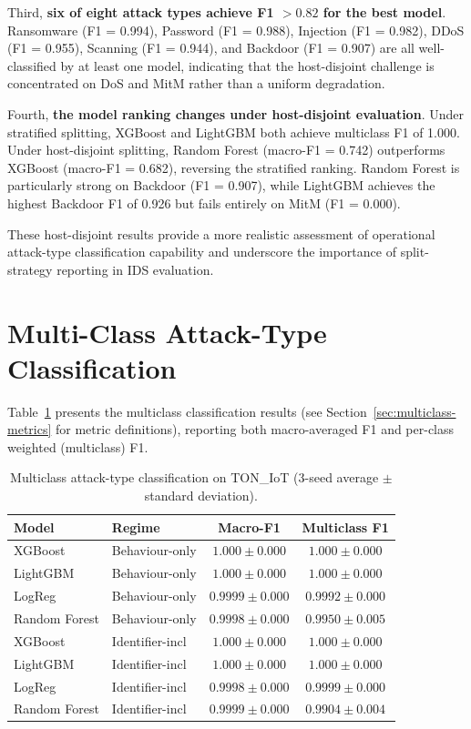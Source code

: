 \documentclass[12pt,a4paper]{report}
\begin{document}
Third, \textbf{six of eight attack types achieve F1 $> 0.82$ for the best model}. Ransomware (F1 = 0.994), Password (F1 = 0.988), Injection (F1 = 0.982), DDoS (F1 = 0.955), Scanning (F1 = 0.944), and Backdoor (F1 = 0.907) are all well-classified by at least one model, indicating that the host-disjoint challenge is concentrated on DoS and MitM rather than a uniform degradation.

Fourth, \textbf{the model ranking changes under host-disjoint evaluation}. Under stratified splitting, XGBoost and LightGBM both achieve multiclass F1 of 1.000. Under host-disjoint splitting, Random Forest (macro-F1 = 0.742) outperforms XGBoost (macro-F1 = 0.682), reversing the stratified ranking. Random Forest is particularly strong on Backdoor (F1 = 0.907), while LightGBM achieves the highest Backdoor F1 of 0.926 but fails entirely on MitM (F1 = 0.000).

These host-disjoint results provide a more realistic assessment of operational attack-type classification capability and underscore the importance of split-strategy reporting in IDS evaluation.

\section{Multi-Class Attack-Type Classification}
\label{sec:multiclass-results}

Table~\ref{tab:multiclass} presents the multiclass classification results (see Section~\ref{sec:multiclass-metrics} for metric definitions), reporting both macro-averaged F1 and per-class weighted (multiclass) F1.

\begin{table}[H]
\centering
\caption{Multiclass attack-type classification on TON\_IoT (3-seed average $\pm$ standard deviation).}
\label{tab:multiclass}
\begin{tabular}{llcc}
\toprule
\textbf{Model} & \textbf{Regime} & \textbf{Macro-F1} & \textbf{Multiclass F1} \\
\midrule
XGBoost & Behaviour-only & $1.000 \pm 0.000$ & $1.000 \pm 0.000$ \\
LightGBM & Behaviour-only & $1.000 \pm 0.000$ & $1.000 \pm 0.000$ \\
LogReg & Behaviour-only & $0.9999 \pm 0.000$ & $0.9992 \pm 0.000$ \\
Random Forest & Behaviour-only & $0.9998 \pm 0.000$ & $0.9950 \pm 0.005$ \\
\midrule
XGBoost & Identifier-incl & $1.000 \pm 0.000$ & $1.000 \pm 0.000$ \\
LightGBM & Identifier-incl & $1.000 \pm 0.000$ & $1.000 \pm 0.000$ \\
LogReg & Identifier-incl & $0.9998 \pm 0.000$ & $0.9999 \pm 0.000$ \\
Random Forest & Identifier-incl & $0.9999 \pm 0.000$ & $0.9904 \pm 0.004$ \\
\bottomrule
\end{tabular}
\end{table}
\end{document}
